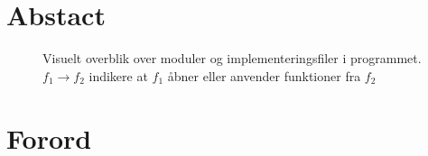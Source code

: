 \documentclass{article}
\newcommand{\newchapter}{
    \cleardoublepage
    \ifthenelse{\isodd{\value{page}}}{}{\hbox{}\newpage}
}
\begin{document}

\pagestyle{plain}

\section{Abstact}

\newpage
\begin{figure}[h]
    \centering
    
    \caption{Visuelt overblik over moduler og implementeringsfiler i programmet. $f_1 \to f_2$ indikere at $f_1$ åbner eller anvender funktioner fra $f_2$}
    \label{fig:svg_example}
\end{figure}

\newchapter
\section{Forord}


\newchapter
\tableofcontents
\newchapter

\newchapter

\newchapter

\newchapter

\newchapter

\newchapter


\newchapter

\end{document}
